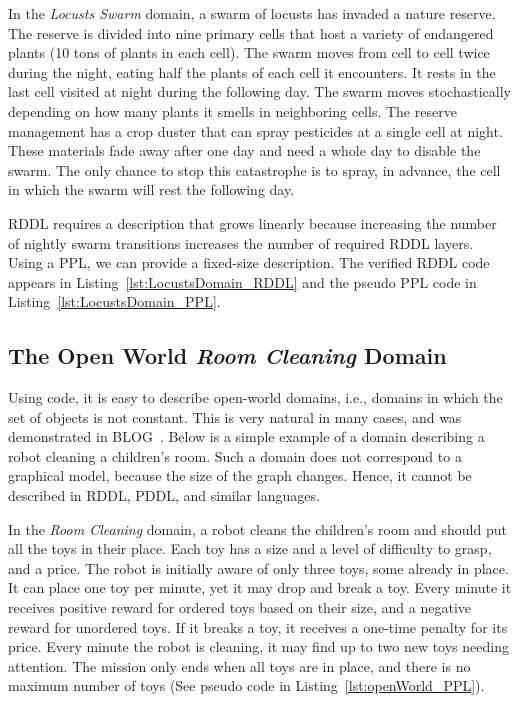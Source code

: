 \documentclass[letterpaper]{article} %
\theoremstyle{definition}
\begin{document}
  
In the {\em Locusts Swarm} domain, a swarm of locusts has invaded a nature reserve. The reserve is divided into nine primary cells that host a variety of endangered plants (10 tons of plants in each cell). The swarm moves from cell to cell twice during the night, eating half the plants of each cell it encounters.
It rests in the last cell visited at night during the following day.
The swarm moves stochastically depending on how many plants it smells in neighboring cells.
The reserve management has a crop duster that can spray pesticides at a single cell at night. These materials fade away after one day and need a whole day to disable the swarm. The only chance to stop this catastrophe is to spray, in advance, the cell in which the swarm will rest the following day.

RDDL requires a description that grows linearly because
increasing the number of nightly swarm transitions increases the number of required RDDL layers. Using a PPL, we can provide a fixed-size description. The verified RDDL code appears in Listing~\ref{lst:LocustsDomain_RDDL} and the pseudo PPL code in Listing~\ref{lst:LocustsDomain_PPL}.

\subsection{The Open World {\em Room Cleaning} Domain}
Using code, it is easy to describe open-world domains, i.e., domains in which the set of objects is not constant. This is very natural in many cases, and was demonstrated in BLOG~\cite{BLOG}. Below is a simple example of a domain describing a robot cleaning a children's room.
Such a domain does not correspond to a graphical model, because the size of the graph changes. Hence, it cannot be described in RDDL, PDDL, and
similar languages. 

In the {\em Room Cleaning} domain, a robot cleans the children's room and should put all the toys in their place.
Each toy has a size and a level of difficulty to grasp, and a price.
The robot is initially aware of only three toys, some already in place.
It can place one toy per minute, yet it may drop and break a toy.
Every minute it receives positive reward for ordered toys based on their size, and a negative reward for unordered toys. If it breaks a toy, it receives a one-time penalty for its price. Every minute the robot is cleaning, it may find up to two new toys needing attention. The mission only ends when all toys are in place, and there is no maximum number of toys (See pseudo code in Listing~\ref{lst:openWorld_PPL}).
\end{document}
